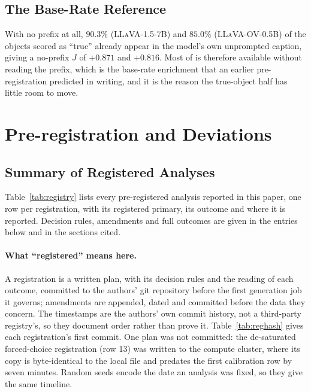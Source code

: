 \subsection{The Base-Rate Reference}
\label{app:noprefix}

With no prefix at all, $90.3\%$ (\textsc{LLaVA-1.5-7B}) and $85.0\%$ (\textsc{LLaVA-OV-0.5B}) of the objects scored as
``true'' already appear in the model's own unprompted caption, giving a no-prefix $J$ of $+0.871$ and
$+0.816$. Most of \rateT{} is therefore available without reading the prefix, which is the base-rate
enrichment that an earlier pre-registration predicted in writing, and it is the reason
the true-object half has little room to move.

\section{Pre-registration and Deviations}
\label{app:prereg}
\subsection{Summary of Registered Analyses}
\label{app:registry}

Table~\ref{tab:registry} lists every pre-registered analysis reported in this paper, one row per
registration, with its registered primary, its outcome and where it is reported. Decision rules,
amendments and full outcomes are given in the entries below and in the sections cited.

\paragraph{What ``registered'' means here.} A registration is a written plan, with its decision rules
and the reading of each outcome, committed to the authors' git repository before the first generation
job it governs; amendments are appended, dated and committed before the data they concern. The
timestamps are the authors' own commit history, not a third-party registry's, so they document order
rather than prove it. Table~\ref{tab:reghash} gives each registration's first commit. One plan was not
committed: the de-saturated forced-choice registration (row 13) was written to the compute cluster,
where its copy is byte-identical to the local file and predates the first calibration row by seven
minutes. Random seeds encode the date an analysis was fixed, so they give the same timeline.

